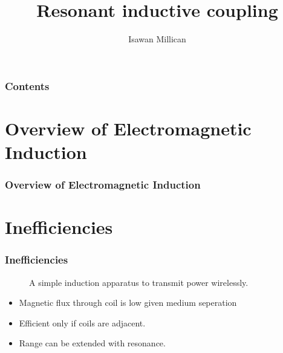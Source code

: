 \documentclass{beamer}
\begin{document}
\title{Resonant inductive coupling}
\author{Isawan Millican}
\subject{Physics}
\frame{\titlepage}
\begin{frame}
  \frametitle{Contents}
\tableofcontents
\end{frame}

\section{Overview of Electromagnetic Induction}
\begin{frame}
  \frametitle{Overview of Electromagnetic Induction}
\end{frame}

\section{Inefficiencies}
\begin{frame}
  \frametitle{Inefficiencies}
  \begin{figure}
    
    \caption{A simple induction apparatus to transmit power wirelessly.}
  \end{figure}
  \begin{itemize}
    \item Magnetic flux through coil is low given medium seperation
    \item Efficient only if coils are adjacent.
    \item Range can be extended with resonance.
  \end{itemize}
\end{frame}
\end{document}
